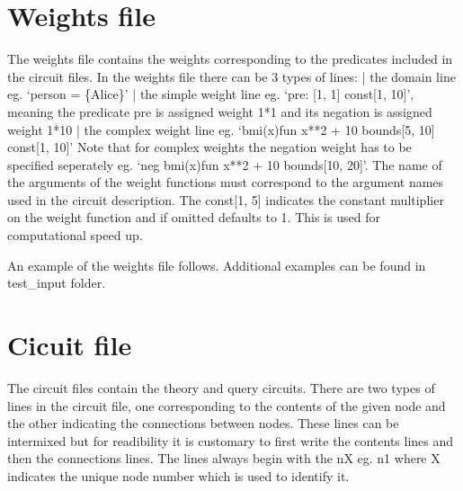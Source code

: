 \documentclass[letterpaper,10pt,english,openany,oneside]{sphinxmanual}
\begin{document}
\section{Weights file}
\label{\detokenize{index:weights-file}}
The weights file contains the weights corresponding to the predicates included in the circuit files.
In the weights file there can be 3 types of lines:
| the domain line eg. ‘person = \{Alice\}’
| the simple weight line eg. ‘pre: {[}1, 1{]} const{[}1, 10{]}’, meaning the predicate pre is assigned weight 1*1 and its negation is assigned weight 1*10
| the complex weight line eg. ‘bmi(x)fun x**2 + 10 bounds{[}5, 10{]} const{[}1, 10{]}’
Note that for complex weights the negation weight has to be specified seperately eg. ‘neg bmi(x)fun x**2 + 10 bounds{[}10, 20{]}’.
The name of the arguments of the weight functions must correspond to the argument names used in the circuit description.
The const{[}1, 5{]} indicates the constant multiplier on the weight function and if omitted defaults to 1. This is used for computational speed up.

An example of the weights file follows. Additional examples can be found in test\_input folder.

\begin{sphinxVerbatim}[commandchars=\\\{\},numbers=left,firstnumber=1,stepnumber=1]
\end{sphinxVerbatim}


\section{Cicuit file}
\label{\detokenize{index:cicuit-file}}
The circuit files contain the theory and query circuits.
There are two types of lines in the circuit file, one corresponding to the contents of the given node and the other indicating the connections between nodes. These lines can be intermixed but for readibility it is customary to first write the contents lines and then the connections lines.
The lines always begin with the nX eg. n1 where X indicates the unique node number which is used to identify it.
\end{document}
